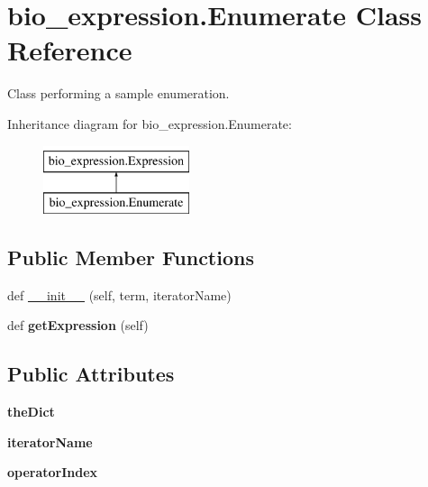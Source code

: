 \hypertarget{classbio__expression_1_1_enumerate}{}\section{bio\+\_\+expression.\+Enumerate Class Reference}
\label{classbio__expression_1_1_enumerate}


Class performing a sample enumeration.  


Inheritance diagram for bio\+\_\+expression.\+Enumerate\+:\begin{figure}[H]
\begin{center}
\leavevmode
\includegraphics[height=2.000000cm]{classbio__expression_1_1_enumerate}
\end{center}
\end{figure}
\subsection*{Public Member Functions}
\begin{DoxyCompactItemize}
\item 
def \hyperlink{classbio__expression_1_1_enumerate_a123fbde89c3f0611c029cc9f25a485ce}{\+\_\+\+\_\+init\+\_\+\+\_\+} (self, term, iterator\+Name)
\item 
def {\bfseries get\+Expression} (self)\hypertarget{classbio__expression_1_1_enumerate_a37ec0901e30a034936fc54ae0eca0910}{}\label{classbio__expression_1_1_enumerate_a37ec0901e30a034936fc54ae0eca0910}

\end{DoxyCompactItemize}
\subsection*{Public Attributes}
\begin{DoxyCompactItemize}
\item 
{\bfseries the\+Dict}\hypertarget{classbio__expression_1_1_enumerate_a073ebe902289aa7fc272670590867337}{}\label{classbio__expression_1_1_enumerate_a073ebe902289aa7fc272670590867337}

\item 
{\bfseries iterator\+Name}\hypertarget{classbio__expression_1_1_enumerate_a1674f2a07f9b8955d89cdf3be608b385}{}\label{classbio__expression_1_1_enumerate_a1674f2a07f9b8955d89cdf3be608b385}

\item 
{\bfseries operator\+Index}\hypertarget{classbio__expression_1_1_enumerate_a4383c04f076c1aeb5bc2a60a9932f619}{}\label{classbio__expression_1_1_enumerate_a4383c04f076c1aeb5bc2a60a9932f619}

\end{DoxyCompactItemize}


